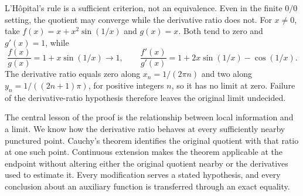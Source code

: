 \documentclass{essay}
\begin{document}
L'H\^opital's rule is a sufficient criterion, not an equivalence. Even in
the finite \(0/0\) setting, the quotient may converge while the derivative
ratio does not. For \(x\ne0\), take \(f(x)=x+x^{2}\sin(1/x)\) and \(g(x)=x\).
Both tend to zero and \(g'(x)=1\), while
\[ \frac{f(x)}{g(x)}=1+x\sin(1/x)\longrightarrow1, \qquad \frac{f'(x)}{g'(x)}=1+2x\sin(1/x)-\cos(1/x). \]
The derivative ratio equals zero along \(x_{n}=1/(2\pi n)\) and two along
\(y_{n}=1/((2n+1)\pi)\), for positive integers \(n\), so it has no limit at
zero. Failure of the derivative-ratio hypothesis therefore leaves the
original limit undecided.

The central lesson of the proof is the relationship between local
information and a limit. We know how the derivative ratio behaves at
every sufficiently nearby punctured point. Cauchy's theorem identifies
the original quotient with that ratio at one such point. Continuous
extension makes the theorem applicable at the endpoint without altering
either the original quotient nearby or the derivatives used to estimate
it. Every modification serves a stated hypothesis, and every conclusion
about an auxiliary function is transferred through an exact equality.
\end{document}
